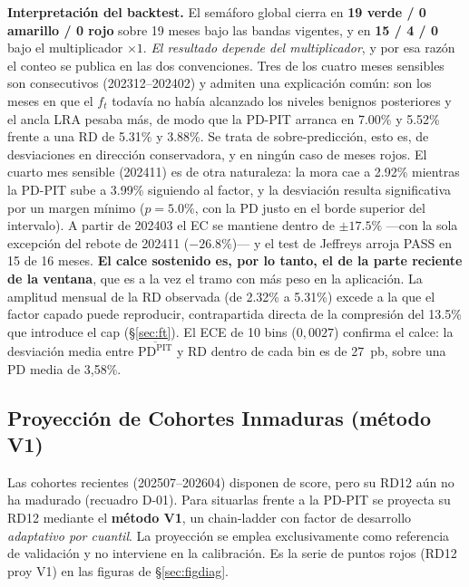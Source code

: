 \documentclass[12pt, a4paper]{article}
\newcommand{\PDPIT}{\ensuremath{\mathrm{PD}^{\mathrm{PIT}}}}
\newcommand{\RD}{\ensuremath{\mathrm{RD}}}
\newcommand{\ft}{\ensuremath{f_t}}
\begin{document}
\noindent\textbf{Interpretación del backtest.} El semáforo global cierra en \textbf{19 verde / 0
amarillo / 0 rojo} sobre 19 meses bajo las bandas vigentes, y en \textbf{15 / 4 / 0} bajo el
multiplicador $\times1$. \emph{El resultado depende del multiplicador}, y por esa razón el conteo se publica en las dos convenciones. Tres de los cuatro
meses sensibles son consecutivos (202312--202402) y admiten una explicación común: son los meses en
que el $\ft$ todavía no había alcanzado los niveles benignos posteriores y el ancla LRA pesaba más,
de modo que la PD-PIT arranca en 7.00\% y 5.52\% frente a una RD de 5.31\% y 3.88\%. Se trata de
sobre-predicción, esto es, de desviaciones en dirección conservadora, y en ningún caso de meses
rojos. El cuarto mes sensible (202411) es de otra naturaleza: la mora cae a 2.92\% mientras la
PD-PIT sube a 3.99\% siguiendo al factor, y la desviación resulta significativa por un margen
mínimo ($p=5.0\%$, con la PD justo en el borde superior del intervalo). A partir de 202403 el EC se
mantiene dentro de $\pm17.5\%$ ---con la sola excepción del rebote de 202411 ($-26.8\%$)--- y el
test de Jeffreys arroja PASS en 15 de 16 meses. \textbf{El calce sostenido es, por lo tanto, el de
la parte reciente de la ventana}, que es a la vez el tramo con más peso en la aplicación. La
amplitud mensual de la RD observada (de 2.32\% a 5.31\%) excede a la que el factor capado puede
reproducir, contrapartida directa de la compresión del 13.5\% que introduce el cap
(\S\ref{sec:ft}).
El ECE de 10 bins ($0{,}0027$) confirma el calce: la desviación media entre $\overline{\PDPIT}$ y
\RD{} dentro de cada bin es de 27~pb, sobre una PD media de 3,58\%.

\subsection{Proyección de Cohortes Inmaduras (método V1)}
\label{sec:proyeccion}
Las cohortes recientes (202507--202604) disponen de score, pero su RD12 aún no ha madurado
(recuadro D-01). Para situarlas frente a la PD-PIT se proyecta su RD12 mediante el \textbf{método
V1}, un chain-ladder con factor de desarrollo \emph{adaptativo por cuantil}. La proyección se
emplea exclusivamente como referencia de validación y no interviene en la calibración. Es la serie de puntos rojos (RD12 proy V1) en
las figuras de \S\ref{sec:figdiag}.
\end{document}
